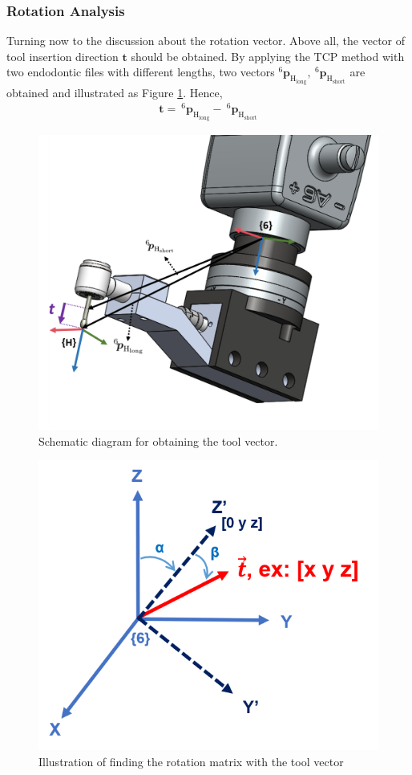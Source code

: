 \subsubsection{Rotation Analysis}
\label{sec:rot inf}
\hspace*{6mm}Turning now to the discussion about the rotation vector. Above all, the vector of tool insertion direction $\boldsymbol{t}$ should be obtained. By applying the TCP method with two endodontic files with different lengths, two vectors $^\mathrm{6}\!\boldsymbol{p}_\mathrm{H_{long}} ,\ ^\mathrm{6}\!\boldsymbol{p}_\mathrm{H_{short}}$ are obtained and illustrated as Figure \ref{fig:tcp2}. Hence, 
\begin{equation}
\begin{split}
\boldsymbol{t} =\ ^\mathrm{6}\!\boldsymbol{p}_\mathrm{H_{long}} -\ ^\mathrm{6}\!\boldsymbol{p}_\mathrm{H_{short}}
\end{split}
\end{equation}
\begin{figure}[htbp]
\begin{center}
\includegraphics[width=0.7\linewidth]{Images/TCP2.png}
\caption{ 
Schematic diagram for obtaining the tool vector. 
}\label{fig:tcp2}
\end{center}
\end{figure}
\begin{figure}[htbp]
\begin{center}
\includegraphics[width=0.6\linewidth]{Images/rot_inf.png}
\caption{
Illustration of finding the rotation matrix with the tool vector
}\label{fig:rot_inf}
\end{center}
\end{figure} 
